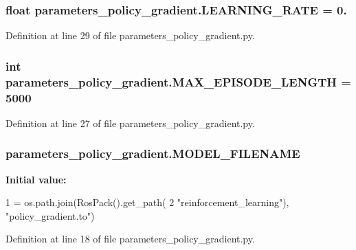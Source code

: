 \subsubsection[{\texorpdfstring{L\+E\+A\+R\+N\+I\+N\+G\+\_\+\+R\+A\+TE}{LEARNING_RATE}}]{\setlength{\rightskip}{0pt plus 5cm}float parameters\+\_\+policy\+\_\+gradient.\+L\+E\+A\+R\+N\+I\+N\+G\+\_\+\+R\+A\+TE = 0.}\hypertarget{namespaceparameters__policy__gradient_ad52de60b86e5029686ccf389f4b19500}{}\label{namespaceparameters__policy__gradient_ad52de60b86e5029686ccf389f4b19500}


Definition at line 29 of file parameters\+\_\+policy\+\_\+gradient.\+py.

\subsubsection[{\texorpdfstring{M\+A\+X\+\_\+\+E\+P\+I\+S\+O\+D\+E\+\_\+\+L\+E\+N\+G\+TH}{MAX_EPISODE_LENGTH}}]{\setlength{\rightskip}{0pt plus 5cm}int parameters\+\_\+policy\+\_\+gradient.\+M\+A\+X\+\_\+\+E\+P\+I\+S\+O\+D\+E\+\_\+\+L\+E\+N\+G\+TH = 5000}\hypertarget{namespaceparameters__policy__gradient_a54b6f1ddc58786a7b9153e81c257248d}{}\label{namespaceparameters__policy__gradient_a54b6f1ddc58786a7b9153e81c257248d}


Definition at line 27 of file parameters\+\_\+policy\+\_\+gradient.\+py.

\subsubsection[{\texorpdfstring{M\+O\+D\+E\+L\+\_\+\+F\+I\+L\+E\+N\+A\+ME}{MODEL_FILENAME}}]{\setlength{\rightskip}{0pt plus 5cm}parameters\+\_\+policy\+\_\+gradient.\+M\+O\+D\+E\+L\+\_\+\+F\+I\+L\+E\+N\+A\+ME}\hypertarget{namespaceparameters__policy__gradient_aaaa453efd9a7edd9430dc0b42be292cd}{}\label{namespaceparameters__policy__gradient_aaaa453efd9a7edd9430dc0b42be292cd}
{\bfseries Initial value\+:}
\begin{DoxyCode}
1 = os.path.join(RosPack().get\_path(
2     \textcolor{stringliteral}{"reinforcement\_learning"}), \textcolor{stringliteral}{"policy\_gradient.to"})
\end{DoxyCode}


Definition at line 18 of file parameters\+\_\+policy\+\_\+gradient.\+py.


